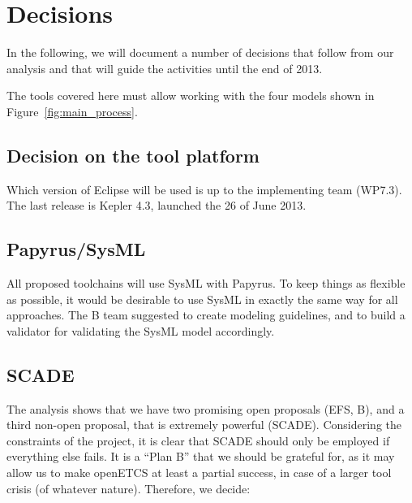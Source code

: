 \section{Decisions}
\label{sec:dec}

In the following, we will document a number of decisions that follow from our analysis and that will guide the activities until the end of 2013.

The tools covered here must allow working with the four models shown in Figure~\ref{fig:main_process}.


\subsection{Decision on the tool platform}
\label{sec:decision_platform}


 Which version of Eclipse will be used is up to the implementing team (WP7.3).  The last release is Kepler 4.3, launched the 26 of June 2013.


\subsection{Papyrus/SysML}


All proposed toolchains will use SysML with Papyrus.  To keep things as flexible as possible, it would be desirable to use SysML in exactly the same way for all approaches.  The B team suggested to create modeling guidelines, and to build a validator for validating the SysML model accordingly.


\subsection{SCADE}

The analysis shows that we have two promising open proposals (EFS, B), and a third non-open proposal, that is extremely powerful (SCADE).  Considering the constraints of the project, it is clear that SCADE should only be employed if everything else fails.  It is a ``Plan B'' that we should be grateful for, as it may allow us to make openETCS at least a partial success, in case of a larger tool crisis (of whatever nature).  Therefore, we decide:

